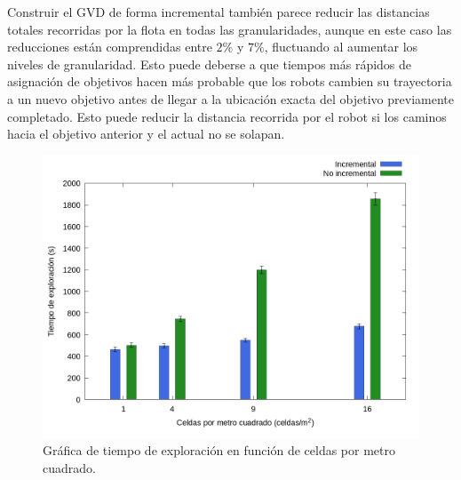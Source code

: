 
Construir el GVD de forma incremental también parece reducir las distancias
totales recorridas por la flota en todas las granularidades, aunque en este
caso las reducciones están comprendidas entre $2\%$ y $7\%$, fluctuando al
aumentar los niveles de granularidad. Esto puede deberse a que tiempos más
rápidos de asignación de objetivos hacen más probable que los robots cambien su
trayectoria a un nuevo objetivo antes de llegar a la ubicación exacta del
objetivo previamente completado. Esto puede reducir la distancia recorrida por
el robot si los caminos hacia el objetivo anterior y el actual no se solapan.








\begin{figure}[H]
  \centerfloat

  \includegraphics[clip=true, width=\graphlen]{imagenes/graficas_chicas/graficas_histo_num/incrementalidad/exploration_time.png}

  \caption{Gráfica de tiempo de exploración en función de celdas por metro cuadrado.}\label{fig:gra:inc:et}

\end{figure}


